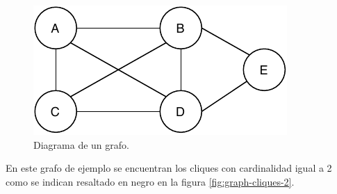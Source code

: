 \begin{figure}[H]
	\centering
	\includegraphics{Figures/graph.pdf}
	\caption{Diagrama de un grafo.}
	\label{fig:graph}
\end{figure}

En este grafo de ejemplo se encuentran los cliques con cardinalidad igual a 2 como se indican resaltado en negro en la figura \ref{fig:graph-cliques-2}.
